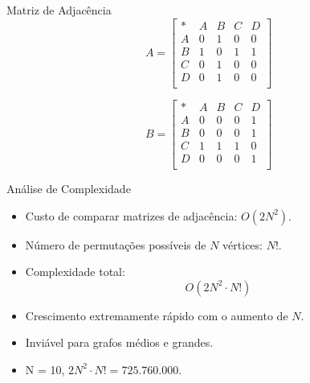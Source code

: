 \documentclass{beamer}
\begin{document}
\begin{frame}{Matriz de Adjacência}
\[
A = \begin{bmatrix}
* & A & B & C & D \\
A & 0 & 1 & 0 & 0 \\
B & 1 & 0 & 1 & 1 \\
C & 0 & 1 & 0 & 0 \\
D & 0 & 1 & 0 & 0 \\
\end{bmatrix}
\]

\[
B = \begin{bmatrix}
* & A & B & C & D \\
A & 0 & 0 & 0 & 1 \\
B & 0 & 0 & 0 & 1 \\
C & 1 & 1 & 1 & 0 \\
D & 0 & 0 & 0 & 1 \\
\end{bmatrix}
\]
\end{frame}


\begin{frame}{Análise de Complexidade}

\begin{itemize}
    \item Custo de comparar matrizes de adjacência: $O(2N^2)$.
    \item Número de permutações possíveis de $N$ vértices: $N!$.
    \item Complexidade total:
    \[
    O(2N^2 \cdot N!) 
    \]
    \item Crescimento extremamente rápido com o aumento de $N$.
    \item Inviável para grafos médios e grandes. 
    \item N = 10, $2N^2 \cdot N! = 725.760.000$.
\end{itemize}

\end{frame}
\end{document}
